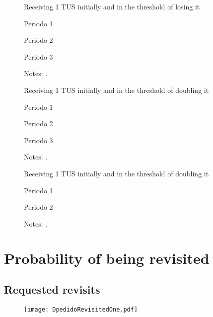 \documentclass[12pt]{article}
\begin{document}
\begin{figure}[H]%
	\caption{Receiving 1 TUS initially and in the threshold of losing it}%
	\centering
	\caption*{ {Periodo 1}}
	\qquad
	\caption*{Periodo 2}
	\qquad
	\caption*{Periodo 3}
	\label{fig:pp2013_prim_1TUS.png}%
	\caption*{ {\footnotesize Notes: .}}
\end{figure}

\begin{figure}[H]%
	\caption{Receiving 1 TUS initially and in the threshold of doubling it}%
	\centering
	\caption*{ {Periodo 1}}
	\qquad
	\caption*{Periodo 2}
	\qquad
	\caption*{Periodo 3}
	\label{fig:pp2013_seg_1TUS.png}%
	\caption*{ {\footnotesize Notes: .}}
\end{figure}

\begin{figure}[H]%
	\caption{Receiving 1 TUS initially and in the threshold of doubling it}%
	\centering
	\caption*{ {Periodo 1}}
	\qquad
	\caption*{Periodo 2}
	\label{fig:pp2013_seg_2TUS}%
	\caption*{ {\footnotesize Notes: .}}
\end{figure}

\section{Probability of being revisited}

\subsection{Requested revisits}
\begin{figure}[H]
	\centering
	\texttt{[image: DpedidoRevisitedOne.pdf]}
	\label{DpedidoRevisitedOne}
\end{figure}

\begin{landscape}
\begin{figure}[H]
	\centering
	
	\label{DpedidoRevisited1Tex}
\end{figure}
\end{landscape}
\end{document}
